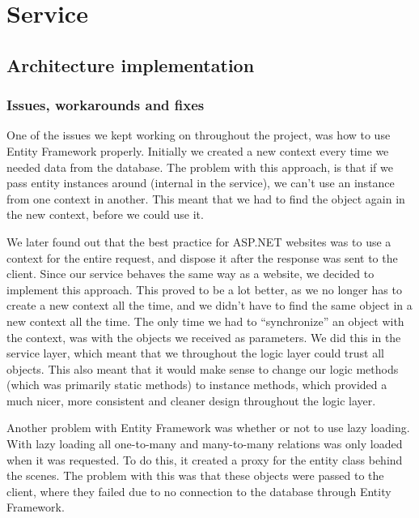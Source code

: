 \section{Service}
\label{Implementation_Service}

\subsection[Architecture]{Architecture implementation}
\label{Implementation_Service_Architecture}

\subsubsection{Issues, workarounds and fixes}
\label{Implementation_Service_Architecture_Issues}

One of the issues we kept working on throughout the project, was how to use Entity Framework properly. Initially we created a new context every time we needed data from the database. The problem with this approach, is that if we pass entity instances around (internal in the service), we can't use an instance from one context in another. This meant that we had to find the object again in the new context, before we could use it.

We later found out that the best practice for ASP.NET websites was to use a context for the entire request, and dispose it after the response was sent to the client. Since our service behaves the same way as a website, we decided to implement this approach. This proved to be a lot better, as we no longer has to create a new context all the time, and we didn't have to find the same object in a new context all the time. The only time we had to ``synchronize'' an object with the context, was with the objects we received as parameters. We did this in the service layer, which meant that we throughout the logic layer could trust all objects. This also meant that it would make sense to change our logic methods (which was primarily static methods) to instance methods, which provided a much nicer, more consistent and cleaner design throughout the logic layer.

Another problem with Entity Framework was whether or not to use lazy loading. With lazy loading all one-to-many and many-to-many relations was only loaded when it was requested. To do this, it created a proxy for the entity class behind the scenes. The problem with this was that these objects were passed to the client, where they failed due to no connection to the database through Entity Framework.

